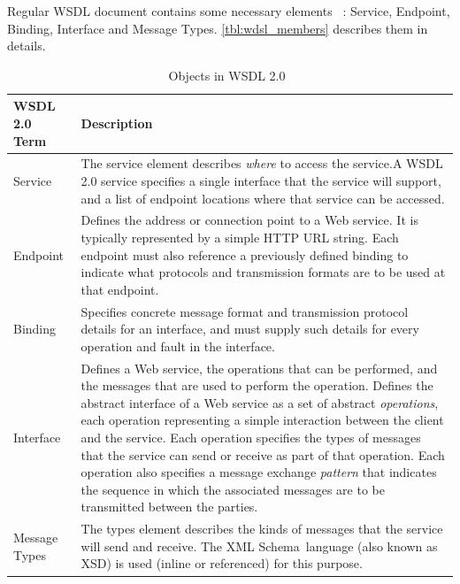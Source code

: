Regular \gls{WSDL} document contains some necessary elements
~\cite{wsdl_language_spec, wikipedia:WSDL}: Service, Endpoint, Binding,
Interface and Message Types. \autoref{tbl:wdsl_members} describes them in
details.


\begin{table}[h]
	\centering	
	\begin{tabular}[h]{|l|p{10cm}|}
		\hline
		\textbf{WSDL 2.0 Term} & 
		\textbf{Description} 	
	    	\tabularnewline
		\hline
			Service &
			The service element describes \textit{where} to access the service.\newline A
			WSDL 2.0 service specifies a single interface that the service will support,
			and a list of endpoint locations where that service can be accessed.
	    	\tabularnewline	    	
	    	\hline
			Endpoint & 
			Defines the address or connection point to a Web service.
			It is typically represented by a simple HTTP URL string.			
			Each endpoint must also reference a previously defined binding to indicate			
			what protocols and transmission formats are to be used at that endpoint.				
	    	\tabularnewline

	    	\hline
			Binding &		
			Specifies concrete message format and transmission protocol details			 
			for an interface, and must supply such details for every operation			 
			and fault in the interface.
	    	\tabularnewline

	    	\hline
			Interface &
			Defines a Web service, the operations that can be performed,			
			and the messages that are used to perform the operation.			
			Defines the abstract interface of a Web service as a set of abstract \textit{operations},			
			each operation representing a simple interaction between the client and the service.			
			Each operation specifies the types of messages that the service can send or receive as part of that operation.			
			Each operation also specifies a message exchange \textit{pattern} that indicates the sequence in which the associated messages are to be transmitted between the parties. 
	    	\tabularnewline

		\hline
			Message Types &
			The types element describes the kinds of messages that the service will send and receive.			
			The XML Schema\footnotemark ~language (also known as XSD) is used (inline or
			referenced) for this purpose.
	    	\tabularnewline
		\hline	  
	\end{tabular} 
	\caption{Objects in WSDL 2.0~\cite{wsdl_language_spec, wikipedia:WSDL} }
	\label{tbl:wdsl_members}
\end{table}
 
